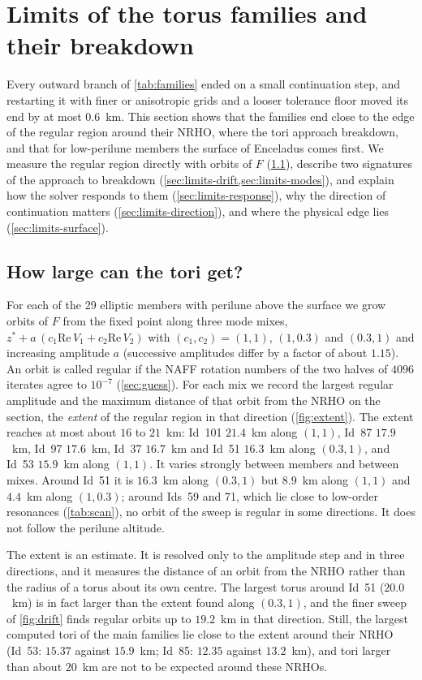 \documentclass[11pt]{article}
\begin{document}
\section{Limits of the torus families and their breakdown}\label{sec:limits}
Every outward branch of \cref{tab:families} ended on a small continuation step, and restarting it
with finer or anisotropic grids and a looser tolerance floor moved its end by at most
$0.6$~km. This section shows that the families end close to the edge of the regular region
around their NRHO, where the tori approach breakdown, and that for low-perilune members the
surface of Enceladus comes first. We measure the regular region directly with orbits of $F$
(\cref{sec:limits-extent}), describe two signatures of the approach to breakdown
(\cref{sec:limits-drift,sec:limits-modes}), and explain how the solver responds to them
(\cref{sec:limits-response}), why the direction of continuation matters
(\cref{sec:limits-direction}), and where the physical edge lies (\cref{sec:limits-surface}).

\subsection{How large can the tori get?}\label{sec:limits-extent}
For each of the 29 elliptic members with perilune above the surface we grow orbits of $F$ from the
fixed point along three mode mixes, $z^* + a\,(c_1\mathrm{Re}\,V_1 + c_2\mathrm{Re}\,V_2)$ with
$(c_1,c_2) = (1,1)$, $(1,0.3)$ and $(0.3,1)$ and increasing amplitude $a$ (successive amplitudes
differ by a factor of about $1.15$). An orbit is called regular if the NAFF rotation numbers of
the two halves of $4096$ iterates agree to $10^{-7}$ (\cref{sec:guess}). For each mix we record the
largest regular amplitude and the maximum distance of that orbit from the NRHO on the section, the
\emph{extent} of the regular region in that direction (\cref{fig:extent}). The extent reaches at
most about $16$ to $21$~km: Id~101 $21.4$~km along $(1,1)$, Id~87 $17.9$~km, Id~97 $17.6$~km,
Id~37 $16.7$~km and Id~51 $16.3$~km along $(0.3,1)$, and Id~53 $15.9$~km along $(1,1)$. It varies
strongly between members and between mixes. Around Id~51 it is $16.3$~km along $(0.3,1)$ but
$8.9$~km along $(1,1)$ and $4.4$~km along $(1,0.3)$; around Ids~59 and 71, which lie close to
low-order resonances (\cref{tab:scan}), no orbit of the sweep is regular in some directions. It
does not follow the perilune altitude.

The extent is an estimate. It is resolved only to the amplitude step and in three directions, and
it measures the distance of an orbit from the NRHO rather than the radius of a torus about its own
centre. The largest torus around Id~51 ($20.0$~km) is in fact larger than the extent found along
$(0.3,1)$, and the finer sweep of \cref{fig:drift} finds regular orbits up to $19.2$~km in that
direction. Still, the largest computed tori of the main families lie close to the extent around
their NRHO (Id~53: $15.37$ against $15.9$~km; Id~85: $12.35$ against $13.2$~km), and tori larger than
about $20$~km are not to be expected around these NRHOs.
\end{document}
